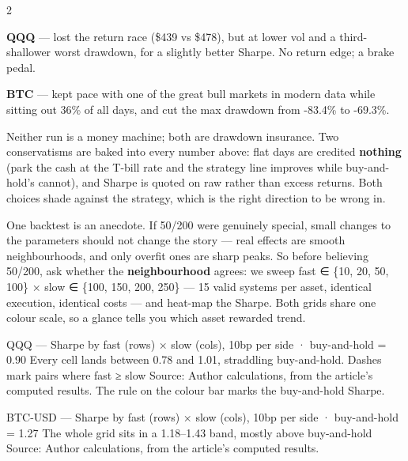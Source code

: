 \documentclass{pyportfolios-note}
\begin{document}
\begin{multicols}{2}
\begin{notebullets}
\item \textbf{QQQ} — lost the return race (\$439 vs \$478), but at lower vol and
      a third-shallower worst drawdown, for a slightly better Sharpe. No return
      edge; a brake pedal.
\item \textbf{BTC} — kept pace with one of the great bull markets in modern data
      while sitting out 36\% of all days, and cut the max drawdown from -83.4\%
      to -69.3\%.
\end{notebullets}
\end{multicols}

Neither run is a money machine; both are drawdown insurance. Two conservatisms
are baked into every number above: flat days are credited \textbf{nothing} (park
the cash at the T-bill rate and the strategy line improves while buy-and-hold's
cannot), and Sharpe is quoted on raw rather than excess returns. Both choices
shade against the strategy, which is the right direction to be wrong in.

\noteneedroom{190bp}

One backtest is an anecdote. If 50/200 were genuinely special, small changes to
the parameters should not change the story — real effects are smooth
neighbourhoods, and only overfit ones are sharp peaks. So before believing
50/200, ask whether the \textbf{neighbourhood} agrees: we sweep fast ∈ \{10, 20,
50, 100\} × slow ∈ \{100, 150, 200, 250\} — 15 valid systems per asset,
identical execution, identical costs — and heat-map the Sharpe. Both grids share
one colour scale, so a glance tells you which asset rewarded trend.

  {QQQ — Sharpe by fast (rows) × slow (cols), 10bp per side · buy-and-hold = 0.90}
  {Every cell lands between 0.78 and 1.01, straddling buy-and-hold. Dashes mark
   pairs where fast ≥ slow}
  {Source: Author calculations, from the article's computed results. The rule on
   the colour bar marks the buy-and-hold Sharpe.}

  {BTC-USD — Sharpe by fast (rows) × slow (cols), 10bp per side · buy-and-hold = 1.27}
  {The whole grid sits in a 1.18–1.43 band, mostly above buy-and-hold}
  {Source: Author calculations, from the article's computed results.}
\end{document}
